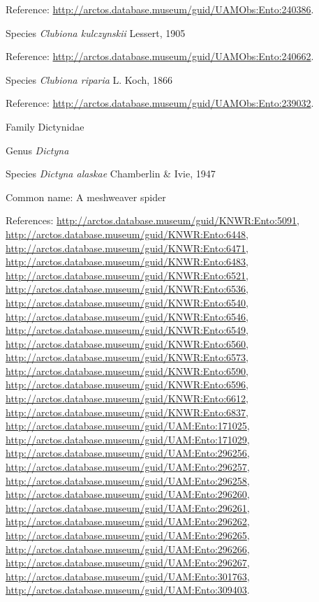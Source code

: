 \documentclass[9pt, article]{memoir}
\begin{document}
\begin{multicols}{2}
Reference: 
\url{http://arctos.database.museum/guid/UAMObs:Ento:240386}.

\vspace{6pt}\noindent\hspace{36pt}Species \textit{Clubiona kulczynskii} Lessert, 1905


Reference: 
\url{http://arctos.database.museum/guid/UAMObs:Ento:240662}.

\vspace{6pt}\noindent\hspace{36pt}Species \textit{Clubiona riparia} L. Koch, 1866


Reference: 
\url{http://arctos.database.museum/guid/UAMObs:Ento:239032}.

\vspace{6pt}\noindent\hspace{24pt}Family Dictynidae


\vspace{6pt}\noindent\hspace{30pt}Genus \textit{Dictyna}


\vspace{6pt}\noindent\hspace{36pt}Species \textit{Dictyna alaskae} Chamberlin \& Ivie, 1947


Common name: A meshweaver spider

References: 
\url{http://arctos.database.museum/guid/KNWR:Ento:5091}, 
\url{http://arctos.database.museum/guid/KNWR:Ento:6448}, 
\url{http://arctos.database.museum/guid/KNWR:Ento:6471}, 
\url{http://arctos.database.museum/guid/KNWR:Ento:6483}, 
\url{http://arctos.database.museum/guid/KNWR:Ento:6521}, 
\url{http://arctos.database.museum/guid/KNWR:Ento:6536}, 
\url{http://arctos.database.museum/guid/KNWR:Ento:6540}, 
\url{http://arctos.database.museum/guid/KNWR:Ento:6546}, 
\url{http://arctos.database.museum/guid/KNWR:Ento:6549}, 
\url{http://arctos.database.museum/guid/KNWR:Ento:6560}, 
\url{http://arctos.database.museum/guid/KNWR:Ento:6573}, 
\url{http://arctos.database.museum/guid/KNWR:Ento:6590}, 
\url{http://arctos.database.museum/guid/KNWR:Ento:6596}, 
\url{http://arctos.database.museum/guid/KNWR:Ento:6612}, 
\url{http://arctos.database.museum/guid/KNWR:Ento:6837}, 
\url{http://arctos.database.museum/guid/UAM:Ento:171025}, 
\url{http://arctos.database.museum/guid/UAM:Ento:171029}, 
\url{http://arctos.database.museum/guid/UAM:Ento:296256}, 
\url{http://arctos.database.museum/guid/UAM:Ento:296257}, 
\url{http://arctos.database.museum/guid/UAM:Ento:296258}, 
\url{http://arctos.database.museum/guid/UAM:Ento:296260}, 
\url{http://arctos.database.museum/guid/UAM:Ento:296261}, 
\url{http://arctos.database.museum/guid/UAM:Ento:296262}, 
\url{http://arctos.database.museum/guid/UAM:Ento:296265}, 
\url{http://arctos.database.museum/guid/UAM:Ento:296266}, 
\url{http://arctos.database.museum/guid/UAM:Ento:296267}, 
\url{http://arctos.database.museum/guid/UAM:Ento:301763}, 
\url{http://arctos.database.museum/guid/UAM:Ento:309403}.


\end{multicols}
\end{document}
